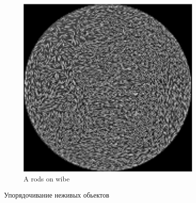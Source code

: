 \begin{figure}
\begin{subfigure}{.4\columnwidth}
                \includegraphics[width=\columnwidth]{Images/Fig6_CollectiveMotion}
                \caption{A rods on wibe}
                \label{fig:CollMot:rods}
        \end{subfigure}
        \caption{Упорядочивание неживых обьектов}
        \label{fig:CollMot:NonLiving}
    \end{figure}
        ~ %
